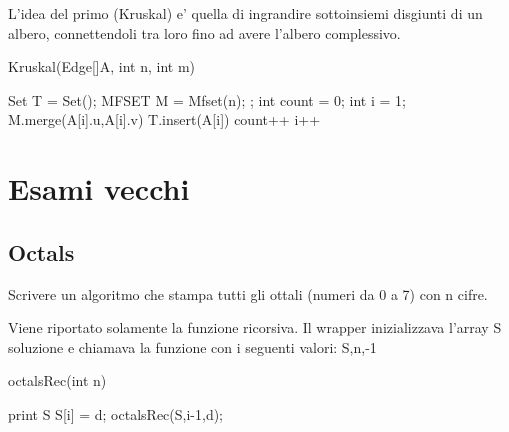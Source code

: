 \documentclass[oneside]{book}
\begin{document}
L'idea del primo (Kruskal) e' quella di ingrandire sottoinsiemi disgiunti di un albero, connettendoli tra loro fino ad avere l'albero complessivo.

\begin{algorithm}
\caption{Kruskal(Edge[]A, int n, int m)\label{alg:cap}}

\begin{algorithmic}
\State Set T = Set();
\State MFSET M = Mfset(n);
;
\State int count = 0;
\State int i = 1;
	\State M.merge(A[i].u,A[i].v)
	\State T.insert(A[i])
	\State count++
	\EndIf
	\State i++
\EndWhile

\end{algorithmic}
\end{algorithm}

\chapter{Esami vecchi}
\section{Octals}
Scrivere un algoritmo che stampa tutti gli ottali (numeri da 0 a 7) con n cifre.

Viene riportato solamente la funzione ricorsiva. Il wrapper inizializzava l'array S soluzione e chiamava la funzione con i seguenti valori: S,n,-1

\begin{algorithm}
\caption{octalsRec(int n)\label{alg:cap}}
\begin{algorithmic}
	\State print S
\Else
			\State S[i] = d;
			\State octalsRec(S,i-1,d);
		\EndIf
	\EndFor
\EndIf

\end{algorithmic}
\end{algorithm}
\end{document}
